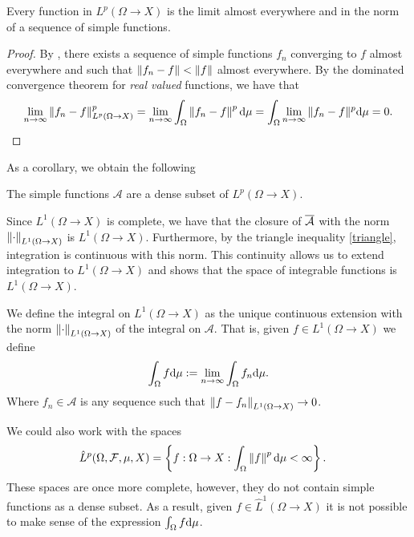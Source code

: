 \documentclass[
    a4paper,
    DIV=14,
    abstract=true,
    numbers=noenddot
]{scrartcl}
\begin{document}
\begin{proposition}
	Every function in $L^p(\Omega\to X)$ is the limit almost everywhere and in the norm of a sequence of simple functions.
\end{proposition}
\begin{proof}
	By , there exists a sequence of simple functions $f_n$ converging to $f$ almost everywhere and such that $\left\lVert f_n-f \right\rVert<\left\lVert f \right\rVert$ almost everywhere. By the dominated convergence theorem for \emph{real valued} functions, we have that
	\begin{align*}
		\lim_{n\to\infty}\left\lVert f_n-f \right\rVert^p_{L^p(\Omega\to X)}=\lim_{n\to\infty}\int_\Omega\left\lVert f_n-f \right\rVert^p\mathrm{d}\mu=\int_{\Omega}\lim_{n \to \infty}\|f_n-f\|^p \mathrm{d}\mu =0.
	\end{align*}
\end{proof}
As a corollary, we obtain the following
\begin{corollary}
	The simple functions $\mathcal{A}$ are a dense subset of $L^p(\Omega\to X)$.
\end{corollary}
Since $L^1(\Omega\to X)$ is complete, we have that the closure of $\overline{\mathcal{A}}$ with the norm $\left\lVert \cdot  \right\rVert_{L^1(\Omega \to X)}$ is $L^1(\Omega\to X)$. Furthermore, by the triangle inequality \eqref{triangle}, integration is continuous with this norm. This continuity allows us to extend integration to $L^1(\Omega \to X)$ and shows that the space of integrable functions is $L^1(\Omega\to X)$.
\begin{definition}\label{def int}
	We define the integral on $L^1(\Omega\to X)$ as the unique continuous extension with the norm $\left\lVert \cdot \right\rVert_{L^1(\Omega\to X)}$ of the integral on $\mathcal{A}$. That is, given $f\in L^1(\Omega\to X)$ we define
	\begin{align*}
		\int_\Omega f \mathrm{d}\mu:=\lim_{n\to\infty} \int_\Omega f_n \mathrm{d}\mu.
	\end{align*}
	Where $f_n\in \mathcal{A}$ is any sequence such that $\left\lVert f-f_n \right\rVert_{L^1(\Omega\to X)}\to 0$.
\end{definition}

\begin{observation}
	We could also work with the spaces
	\begin{align*}
		\hat{L}^p(\Omega,\mathcal{F},\mu,X) & =\left\{f:\Omega\to X: \int_\Omega \left\lVert f \right\rVert^p \mathrm{d}\mu<\infty\right\}.
	\end{align*}
	These spaces are once more complete, however, they do not contain simple functions as a dense subset. As a result, given $f \in \hat{L}^1(\Omega \to X) $ it is not possible to make sense of the expression $\int_\Omega f \mathrm{d}\mu$.
\end{observation}
\end{document}
